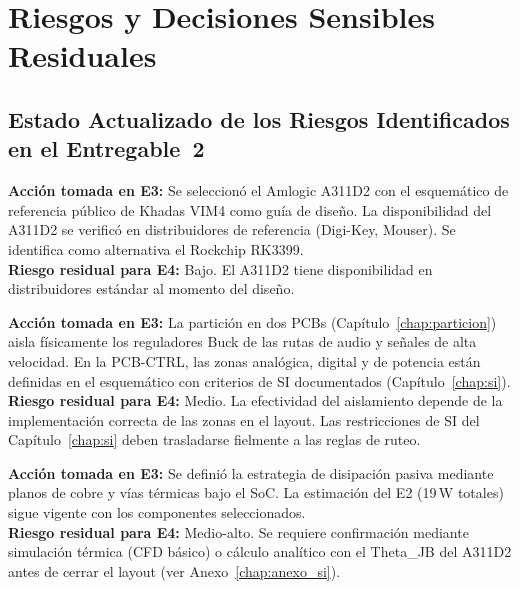 \chapter{Riesgos y Decisiones Sensibles Residuales}
\label{chap:riesgos}

\section{Estado Actualizado de los Riesgos Identificados en el Entregable~2}
\label{sec:risk_actualizacion}

\begin{riskbox}
  \textbf{Acción tomada en E3:} Se seleccionó el Amlogic A311D2 con el
  esquemático de referencia público de Khadas VIM4 como guía de diseño. La
  disponibilidad del A311D2 se verificó en distribuidores de referencia
  (Digi-Key, Mouser). Se identifica como alternativa el Rockchip RK3399.\\
  \textbf{Riesgo residual para E4:} Bajo. El A311D2 tiene disponibilidad
  en distribuidores estándar al momento del diseño.
\end{riskbox}

\begin{riskbox}
  \textbf{Acción tomada en E3:} La partición en dos PCBs (Capítulo~\ref{chap:particion})
  aisla físicamente los reguladores Buck de las rutas de audio y señales
  de alta velocidad. En la PCB-CTRL, las zonas analógica, digital y de potencia
  están definidas en el esquemático con criterios de SI documentados
  (Capítulo~\ref{chap:si}).\\
  \textbf{Riesgo residual para E4:} Medio. La efectividad del aislamiento depende
  de la implementación correcta de las zonas en el layout. Las restricciones de SI
  del Capítulo~\ref{chap:si} deben trasladarse fielmente a las reglas de ruteo.
\end{riskbox}

\begin{riskbox}
  \textbf{Acción tomada en E3:} Se definió la estrategia de disipación pasiva
  mediante planos de cobre y vías térmicas bajo el SoC. La estimación del E2
  (19\,W totales) sigue vigente con los componentes seleccionados.\\
  \textbf{Riesgo residual para E4:} Medio-alto. Se requiere confirmación mediante
  simulación térmica (CFD básico) o cálculo analítico con el Theta\_JB del A311D2
  antes de cerrar el layout (ver Anexo~\ref{chap:anexo_si}).
\end{riskbox}

